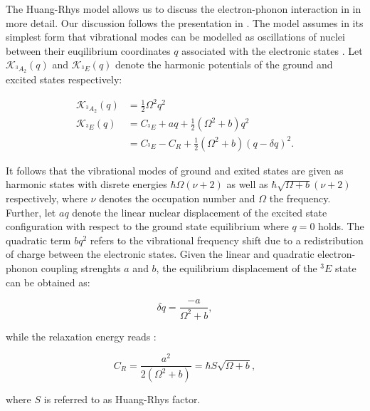     The Huang-Rhys model allows us to discuss the electron-phonon interaction in \sivs in more detail. Our discussion follows the presentation in \cite{Doherty2013}. The model assumes in its simplest form that vibrational modes can be modelled as oscillations of nuclei between their euqilibrium coordinates $q$ associated with the electronic states \cite{Riedrich-moller2014}. Let $\mathcal{K}_{{}^{3}A_{2}}(q)$ and $\mathcal{K}_{{}^{3}E}(q)$ denote the harmonic potentials of the ground and excited states respectively:

    \begin{align}
      \mathcal{K}_{{}^{3}A_{2}}(q) & = \frac{1}{2} \Omega^2 q^2 \\
      \mathcal{K}_{{}^{3}E}(q) & = C_{{}^{3}E} + aq + \frac{1}{2} (\Omega^2 + b)q^2 \\
       & = C_{{}^{3}E} - C_R + \frac{1}{2} (\Omega^2 + b)(q - \delta q)^2.
    \end{align}

    It follows that the vibrational modes of ground and exited states are given as harmonic states with disrete energies $\hbar \Omega (\nu + 2)$ as well as $\hbar \sqrt{\Omega + b} (\nu + 2)$ respectively, where $\nu$ denotes the occupation number and $\Omega$ the frequency.
    Further, let $aq$ denote the linear nuclear displacement of the excited state configuration with respect to the ground state equilibrium where $q = 0$ holds.
    The quadratic term $bq^2$ refers to the vibrational frequency shift due to a redistribution of charge between the electronic states.
    Given the linear and quadratic electron-phonon coupling strenghts $a$ and $b$, the equilibrium displacement of the ${}^{3}E$ state can be obtained as:

    \begin{equation}
      \delta q = \frac{-a}{\Omega^2 + b },
    \end{equation}

    while the relaxation energy reads \cite{Doherty2013}:

    \begin{equation}
      C_R = \frac{a^2}{2 (\Omega^2 + b)} = \hbar S \sqrt{\Omega + b},
    \end{equation}


   where $S$ is referred to as Huang-Rhys factor.

